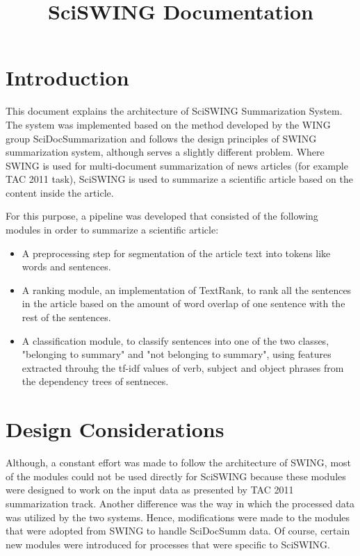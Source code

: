 \documentclass[12pt]{scrreprt}
\title{SciSWING Documentation}
\begin{document}
\maketitle
\tableofcontents
\chapter{Introduction}
This document explains the architecture of SciSWING Summarization System.
The system was implemented based on the method developed by the WING group SciDocSummarization and follows the design principles of SWING summarization system, although serves a slightly different problem.
Where SWING is used for multi-document summarization of news articles (for example TAC 2011 task), SciSWING is used to summarize a scientific article based on the content inside the article.

For this purpose, a pipeline was developed that consisted of the following modules in order to summarize a scientific article:
\begin{itemize}
  \item A preprocessing step for segmentation of the article text into tokens like words and sentences.
  \item A ranking module, an implementation of TextRank, to rank all the sentences in the article based on the amount of word overlap of one sentence with the rest of the sentences.
  \item A classification module, to classify sentences into one of the two classes, "belonging to summary" and "not belonging to summary", using features extracted throuhg the tf-idf values of verb, subject and object phrases from the dependency trees of sentneces.
\end{itemize}
\chapter{Design Considerations}
Although, a constant effort was made to follow the architecture of SWING, most of the modules could not be used directly for SciSWING because these modules were designed to work on the input data as presented by TAC 2011 summarization track.
Another difference was the way in which the processed data was utilized by the two systems.
Hence, modifications were made to the modules that were adopted from SWING to handle SciDocSumm data.
Of course, certain new modules were introduced for processes that were specific to SciSWING.
\end{document}
